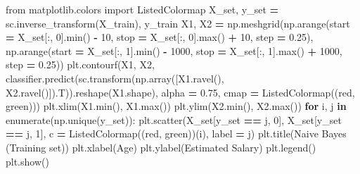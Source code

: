 \documentclass[
]{book}
\newenvironment{Shaded}{\begin{snugshade}}{\end{snugshade}}
\newcommand{\BuiltInTok}[1]{#1}
\newcommand{\ControlFlowTok}[1]{\textcolor[rgb]{0.13,0.29,0.53}{\textbf{#1}}}
\newcommand{\DecValTok}[1]{\textcolor[rgb]{0.00,0.00,0.81}{#1}}
\newcommand{\FloatTok}[1]{\textcolor[rgb]{0.00,0.00,0.81}{#1}}
\newcommand{\ImportTok}[1]{#1}
\newcommand{\KeywordTok}[1]{\textcolor[rgb]{0.13,0.29,0.53}{\textbf{#1}}}
\newcommand{\NormalTok}[1]{#1}
\newcommand{\OperatorTok}[1]{\textcolor[rgb]{0.81,0.36,0.00}{\textbf{#1}}}
\newcommand{\StringTok}[1]{\textcolor[rgb]{0.31,0.60,0.02}{#1}}
\theoremstyle{definition}
\theoremstyle{definition}
\theoremstyle{definition}
\theoremstyle{definition}
\theoremstyle{remark}
\begin{document}
\begin{Shaded}
\begin{Highlighting}[]
\ImportTok{from}\NormalTok{ matplotlib.colors }\ImportTok{import}\NormalTok{ ListedColormap}
\NormalTok{X\_set, y\_set }\OperatorTok{=}\NormalTok{ sc.inverse\_transform(X\_train), y\_train}
\NormalTok{X1, X2 }\OperatorTok{=}\NormalTok{ np.meshgrid(np.arange(start }\OperatorTok{=}\NormalTok{ X\_set[:, }\DecValTok{0}\NormalTok{].}\BuiltInTok{min}\NormalTok{() }\OperatorTok{{-}} \DecValTok{10}\NormalTok{, stop }\OperatorTok{=}\NormalTok{ X\_set[:, }\DecValTok{0}\NormalTok{].}\BuiltInTok{max}\NormalTok{() }\OperatorTok{+} \DecValTok{10}\NormalTok{, step }\OperatorTok{=} \FloatTok{0.25}\NormalTok{),}
\NormalTok{                     np.arange(start }\OperatorTok{=}\NormalTok{ X\_set[:, }\DecValTok{1}\NormalTok{].}\BuiltInTok{min}\NormalTok{() }\OperatorTok{{-}} \DecValTok{1000}\NormalTok{, stop }\OperatorTok{=}\NormalTok{ X\_set[:, }\DecValTok{1}\NormalTok{].}\BuiltInTok{max}\NormalTok{() }\OperatorTok{+} \DecValTok{1000}\NormalTok{, step }\OperatorTok{=} \FloatTok{0.25}\NormalTok{))}
\NormalTok{plt.contourf(X1, X2, classifier.predict(sc.transform(np.array([X1.ravel(), X2.ravel()]).T)).reshape(X1.shape),}
\NormalTok{             alpha }\OperatorTok{=} \FloatTok{0.75}\NormalTok{, cmap }\OperatorTok{=}\NormalTok{ ListedColormap((}\StringTok{\textquotesingle{}red\textquotesingle{}}\NormalTok{, }\StringTok{\textquotesingle{}green\textquotesingle{}}\NormalTok{)))}
\NormalTok{plt.xlim(X1.}\BuiltInTok{min}\NormalTok{(), X1.}\BuiltInTok{max}\NormalTok{())}
\NormalTok{plt.ylim(X2.}\BuiltInTok{min}\NormalTok{(), X2.}\BuiltInTok{max}\NormalTok{())}
\ControlFlowTok{for}\NormalTok{ i, j }\KeywordTok{in} \BuiltInTok{enumerate}\NormalTok{(np.unique(y\_set)):}
\NormalTok{    plt.scatter(X\_set[y\_set }\OperatorTok{==}\NormalTok{ j, }\DecValTok{0}\NormalTok{], X\_set[y\_set }\OperatorTok{==}\NormalTok{ j, }\DecValTok{1}\NormalTok{], c }\OperatorTok{=}\NormalTok{ ListedColormap((}\StringTok{\textquotesingle{}red\textquotesingle{}}\NormalTok{, }\StringTok{\textquotesingle{}green\textquotesingle{}}\NormalTok{))(i), label }\OperatorTok{=}\NormalTok{ j)}
\NormalTok{plt.title(}\StringTok{\textquotesingle{}Naive Bayes (Training set)\textquotesingle{}}\NormalTok{)}
\NormalTok{plt.xlabel(}\StringTok{\textquotesingle{}Age\textquotesingle{}}\NormalTok{)}
\NormalTok{plt.ylabel(}\StringTok{\textquotesingle{}Estimated Salary\textquotesingle{}}\NormalTok{)}
\NormalTok{plt.legend()}
\NormalTok{plt.show()}
\end{Highlighting}
\end{Shaded}
\end{document}
